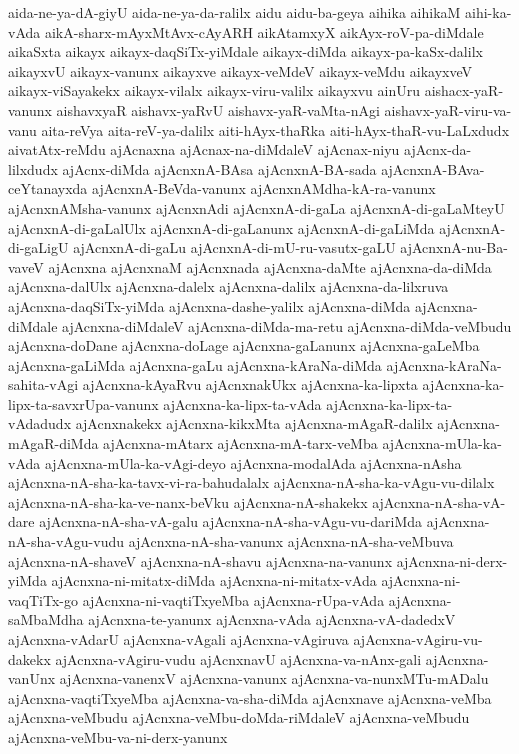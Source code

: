 {aida-ne-ya-dA-giyU
aida-ne-ya-da-ralilx
aidu
aidu-ba-geya
aihika
aihikaM
aihi-ka-vAda
aikA-sharx-mAyxMtAvx-cAyARH
aikAtamxyX
aikAyx-roV-pa-diMdale
aikaSxta
aikayx
aikayx-daqSiTx-yiMdale
aikayx-diMda
aikayx-pa-kaSx-dalilx
aikayxvU
aikayx-vanunx
aikayxve
aikayx-veMdeV
aikayx-veMdu
aikayxveV
aikayx-viSayakekx
aikayx-vilalx
aikayx-viru-valilx
aikayxvu
ainUru
aishacx-yaR-vanunx
aishavxyaR
aishavx-yaRvU
aishavx-yaR-vaMta-nAgi
aishavx-yaR-viru-va-vanu
aita-reVya
aita-reV-ya-dalilx
aiti-hAyx-thaRka
aiti-hAyx-thaR-vu-LaLxdudx
aivatAtx-reMdu
ajAcnaxna
ajAcnax-na-diMdaleV
ajAcnax-niyu
ajAcnx-da-lilxdudx
ajAcnx-diMda
ajAcnxnA-BAsa
ajAcnxnA-BA-sada
ajAcnxnA-BAva-ceYtanayxda
ajAcnxnA-BeVda-vanunx
ajAcnxnAMdha-kA-ra-vanunx
ajAcnxnAMsha-vanunx
ajAcnxnAdi
ajAcnxnA-di-gaLa
ajAcnxnA-di-gaLaMteyU
ajAcnxnA-di-gaLalUlx
ajAcnxnA-di-gaLanunx
ajAcnxnA-di-gaLiMda
ajAcnxnA-di-gaLigU
ajAcnxnA-di-gaLu
ajAcnxnA-di-mU-ru-vasutx-gaLU
ajAcnxnA-nu-Ba-vaveV
ajAcnxna
ajAcnxnaM
ajAcnxnada
ajAcnxna-daMte
ajAcnxna-da-diMda
ajAcnxna-dalUlx
ajAcnxna-dalelx
ajAcnxna-dalilx
ajAcnxna-da-lilxruva
ajAcnxna-daqSiTx-yiMda
ajAcnxna-dashe-yalilx
ajAcnxna-diMda
ajAcnxna-diMdale
ajAcnxna-diMdaleV
ajAcnxna-diMda-ma-retu
ajAcnxna-diMda-veMbudu
ajAcnxna-doDane
ajAcnxna-doLage
ajAcnxna-gaLanunx
ajAcnxna-gaLeMba
ajAcnxna-gaLiMda
ajAcnxna-gaLu
ajAcnxna-kAraNa-diMda
ajAcnxna-kAraNa-sahita-vAgi
ajAcnxna-kAyaRvu
ajAcnxnakUkx
ajAcnxna-ka-lipxta
ajAcnxna-ka-lipx-ta-savxrUpa-vanunx
ajAcnxna-ka-lipx-ta-vAda
ajAcnxna-ka-lipx-ta-vAdadudx
ajAcnxnakekx
ajAcnxna-kikxMta
ajAcnxna-mAgaR-dalilx
ajAcnxna-mAgaR-diMda
ajAcnxna-mAtarx
ajAcnxna-mA-tarx-veMba
ajAcnxna-mUla-ka-vAda
ajAcnxna-mUla-ka-vAgi-deyo
ajAcnxna-modalAda
ajAcnxna-nAsha
ajAcnxna-nA-sha-ka-tavx-vi-ra-bahudalalx
ajAcnxna-nA-sha-ka-vAgu-vu-dilalx
ajAcnxna-nA-sha-ka-ve-nanx-beVku
ajAcnxna-nA-shakekx
ajAcnxna-nA-sha-vA-dare
ajAcnxna-nA-sha-vA-galu
ajAcnxna-nA-sha-vAgu-vu-dariMda
ajAcnxna-nA-sha-vAgu-vudu
ajAcnxna-nA-sha-vanunx
ajAcnxna-nA-sha-veMbuva
ajAcnxna-nA-shaveV
ajAcnxna-nA-shavu
ajAcnxna-na-vanunx
ajAcnxna-ni-derx-yiMda
ajAcnxna-ni-mitatx-diMda
ajAcnxna-ni-mitatx-vAda
ajAcnxna-ni-vaqTiTx-go
ajAcnxna-ni-vaqtiTxyeMba
ajAcnxna-rUpa-vAda
ajAcnxna-saMbaMdha
ajAcnxna-te-yanunx
ajAcnxna-vAda
ajAcnxna-vA-dadedxV
ajAcnxna-vAdarU
ajAcnxna-vAgali
ajAcnxna-vAgiruva
ajAcnxna-vAgiru-vu-dakekx
ajAcnxna-vAgiru-vudu
ajAcnxnavU
ajAcnxna-va-nAnx-gali
ajAcnxna-vanUnx
ajAcnxna-vanenxV
ajAcnxna-vanunx
ajAcnxna-va-nunxMTu-mADalu
ajAcnxna-vaqtiTxyeMba
ajAcnxna-va-sha-diMda
ajAcnxnave
ajAcnxna-veMba
ajAcnxna-veMbudu
ajAcnxna-veMbu-doMda-riMdaleV
ajAcnxna-veMbudu
ajAcnxna-veMbu-va-ni-derx-yanunx
}
